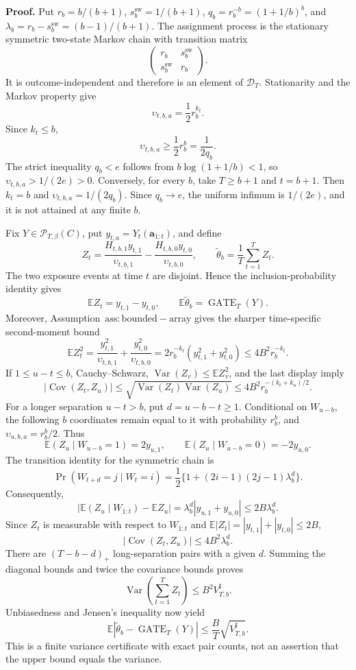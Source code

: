 \textbf{Proof.} Put \(r_b=b/(b+1)\), \(s_b^{\mathrm{sw}}=1/(b+1)\), \(q_b=r_b^{-b}=(1+1/b)^b\), and \(\lambda_b=r_b-s_b^{\mathrm{sw}}=(b-1)/(b+1)\). The assignment process is the stationary symmetric two-state Markov chain with transition matrix
\[
\begin{pmatrix}r_b&s_b^{\mathrm{sw}}\\s_b^{\mathrm{sw}}&r_b\end{pmatrix}.
\]
It is outcome-independent and therefore is an element of \(\mathcal D_T\). Stationarity and the Markov property give
\[
\upsilon_{t,b,a}=\frac12r_b^{k_t}.
\]
Since \(k_t\le b\),
\[
\upsilon_{t,b,a}\ge\frac12r_b^b=\frac{1}{2q_b}.
\]
The strict inequality \(q_b<e\) follows from \(b\log(1+1/b)<1\), so \(\upsilon_{t,b,a}>1/(2e)>0\). Conversely, for every \(b\), take \(T\ge b+1\) and \(t=b+1\). Then \(k_t=b\) and \(\upsilon_{t,b,a}=1/(2q_b)\). Since \(q_b\to e\), the uniform infimum is \(1/(2e)\), and it is not attained at any finite \(b\).

Fix \(Y\in\mathcal P_{T,\beta}(C)\), put \(y_{t,a}=Y_t(\mathbf a_{1:t})\), and define
\[
Z_t=\frac{H_{t,b,1}y_{t,1}}{\upsilon_{t,b,1}}-\frac{H_{t,b,0}y_{t,0}}{\upsilon_{t,b,0}},
\qquad
\widetilde\theta_b=\frac1T\sum_{t=1}^T Z_t.
\]
The two exposure events at time \(t\) are disjoint. Hence the inclusion-probability identity gives
\[
\mathbb E Z_t=y_{t,1}-y_{t,0},
\qquad
\mathbb E\widetilde\theta_b=\operatorname{GATE}_T(Y).
\]
Moreover, Assumption~\(\mathrm{ass:bounded-array}\) gives the sharper time-specific second-moment bound
\[
\mathbb E Z_t^2
=\frac{y_{t,1}^2}{\upsilon_{t,b,1}}+\frac{y_{t,0}^2}{\upsilon_{t,b,0}}
=2r_b^{-k_t}(y_{t,1}^2+y_{t,0}^2)
\le4B^2r_b^{-k_t}.
\]
If \(1\le u-t\le b\), Cauchy--Schwarz, \(\operatorname{Var}(Z_v)\le\mathbb E Z_v^2\), and the last display imply
\[
\left|\operatorname{Cov}(Z_t,Z_u)\right|
\le\sqrt{\operatorname{Var}(Z_t)\operatorname{Var}(Z_u)}
\le4B^2r_b^{-(k_t+k_u)/2}.
\]
For a longer separation \(u-t>b\), put \(d=u-b-t\ge1\). Conditional on \(W_{u-b}\), the following \(b\) coordinates remain equal to it with probability \(r_b^b\), and \(\upsilon_{u,b,a}=r_b^b/2\). Thus
\[
\mathbb E(Z_u\mid W_{u-b}=1)=2y_{u,1},
\qquad
\mathbb E(Z_u\mid W_{u-b}=0)=-2y_{u,0}.
\]
The transition identity for the symmetric chain is
\[
\Pr(W_{t+d}=j\mid W_t=i)
=\frac12\{1+(2i-1)(2j-1)\lambda_b^d\}.
\]
Consequently,
\[
\left|\mathbb E(Z_u\mid W_{1:t})-\mathbb EZ_u\right|
=\lambda_b^d|y_{u,1}+y_{u,0}|
\le2B\lambda_b^d.
\]
Since \(Z_t\) is measurable with respect to \(W_{1:t}\) and \(\mathbb E|Z_t|=|y_{t,1}|+|y_{t,0}|\le2B\),
\[
|\operatorname{Cov}(Z_t,Z_u)|\le4B^2\lambda_b^d.
\]
There are \((T-b-d)_+\) long-separation pairs with a given \(d\). Summing the diagonal bounds and twice the covariance bounds proves
\[
\operatorname{Var}\left(\sum_{t=1}^T Z_t\right)\le B^2V_{T,b}^{\sharp}.
\]
Unbiasedness and Jensen's inequality now yield
\[
\mathbb E\left|\widetilde\theta_b-\operatorname{GATE}_T(Y)\right|
\le\frac BT\sqrt{V_{T,b}^{\sharp}}.
\]
This is a finite variance certificate with exact pair counts, not an assertion that the upper bound equals the variance.

